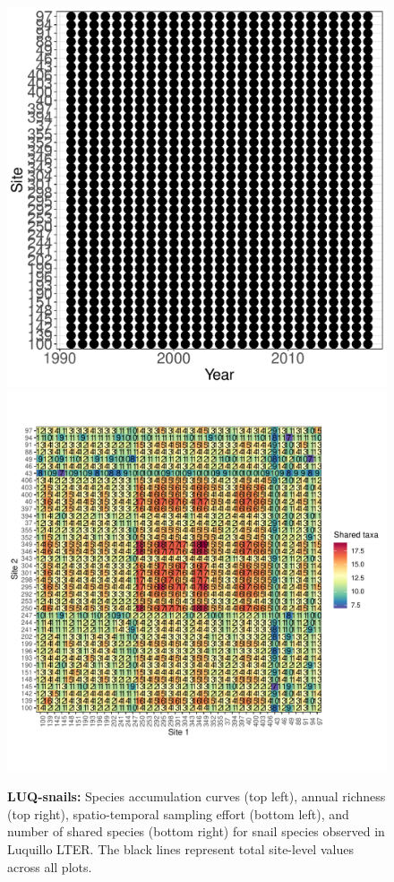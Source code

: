 \documentclass[11pt, oneside]{article}
\begin{document}
\begin{figure}[h!]
\includegraphics[scale = 0.4]{luq-snails-compagnoni_spatiotemporal_sampling_effort.pdf}
\includegraphics[scale = 0.4]{luq-snails-compagnoni_spp_shared.pdf}
\caption{{\bf LUQ-snails:} Species accumulation curves (top left),  annual richness (top right), spatio-temporal sampling effort (bottom left), and number of shared species (bottom right) for snail species observed in Luquillo LTER. The black lines represent total site-level values across all plots.}
\label{luq-snails}
\end{figure}
\end{document}
